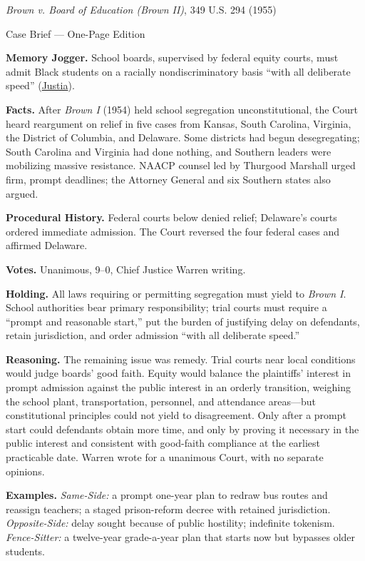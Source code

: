 \documentclass[12pt]{article}
\begin{document}
\begin{center}
{\Large \textit{Brown v. Board of Education (Brown II)}, 349 U.S. 294 (1955)\par}
\vspace{0.3em}
{\normalsize Case Brief --- One-Page Edition\par}
\end{center}

\textbf{Memory Jogger.} School boards, supervised by federal equity courts, must admit Black students on a racially nondiscriminatory basis ``with all deliberate speed'' (\href{https://supreme.justia.com/cases/federal/us/349/294/}{Justia}).

\textbf{Facts.} After \textit{Brown I} (1954) held school segregation unconstitutional, the Court heard reargument on relief in five cases from Kansas, South Carolina, Virginia, the District of Columbia, and Delaware. Some districts had begun desegregating; South Carolina and Virginia had done nothing, and Southern leaders were mobilizing massive resistance. NAACP counsel led by Thurgood Marshall urged firm, prompt deadlines; the Attorney General and six Southern states also argued.

\textbf{Procedural History.} Federal courts below denied relief; Delaware's courts ordered immediate admission. The Court reversed the four federal cases and affirmed Delaware.

\textbf{Votes.} Unanimous, 9--0, Chief Justice Warren writing.

\textbf{Holding.} All laws requiring or permitting segregation must yield to \textit{Brown I}. School authorities bear primary responsibility; trial courts must require a ``prompt and reasonable start,'' put the burden of justifying delay on defendants, retain jurisdiction, and order admission ``with all deliberate speed.''

\textbf{Reasoning.} The remaining issue was remedy. Trial courts near local conditions would judge boards' good faith. Equity would balance the plaintiffs' interest in prompt admission against the public interest in an orderly transition, weighing the school plant, transportation, personnel, and attendance areas---but constitutional principles could not yield to disagreement. Only after a prompt start could defendants obtain more time, and only by proving it necessary in the public interest and consistent with good-faith compliance at the earliest practicable date. Warren wrote for a unanimous Court, with no separate opinions.

\textbf{Examples.} \emph{Same-Side:} a prompt one-year plan to redraw bus routes and reassign teachers; a staged prison-reform decree with retained jurisdiction. \emph{Opposite-Side:} delay sought because of public hostility; indefinite tokenism. \emph{Fence-Sitter:} a twelve-year grade-a-year plan that starts now but bypasses older students.
\end{document}
